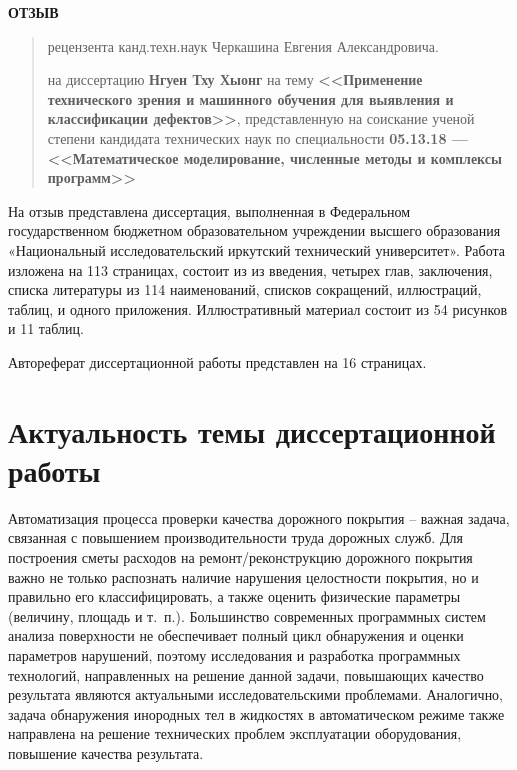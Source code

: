 \documentclass[14pt]{extarticle}
\begin{document}
\thispagestyle{empty}

\vspace{1em}
\begin{center}
  \large\textbf{ОТЗЫВ}
\end{center}
\begin{quote}
  \noindent рецензента канд.техн.наук Черкашина Евгения Александровича.

  \noindent на диссертацию \textbf{Нгуен Тху Хыонг} на тему \textbf{<<Применение технического зрения и машинного обучения для выявления и классификации дефектов>>}, представленную на соискание ученой степени кандидата технических наук по специальности \textbf{05.13.18 — <<Математическое моделирование, численные методы и комплексы программ>>}
\end{quote}


На отзыв представлена диссертация, выполненная в Федеральном государственном бюджетном образовательном учреждении высшего образования «Национальный исследовательский иркутский технический университет».  Работа изложена на 113 страницах, состоит из из введения, четырех глав, заключения, списка литературы из 114 наименований, списков сокращений, иллюстраций, таблиц, и одного приложения.  Иллюстративный материал состоит из 54 рисунков и 11 таблиц.

Автореферат диссертационной работы представлен на 16 страницах.

\section{Актуальность темы диссертационной работы}

Автоматизация процесса проверки качества дорожного покрытия -- важная задача, связанная с повышением производительности труда дорожных служб.  Для построения сметы расходов на ремонт/реконструкцию дорожного покрытия важно не только распознать наличие нарушения целостности покрытия, но и правильно его классифицировать, а также оценить физические параметры (величину, площадь и т.~п.).  Большинство современных программных систем анализа поверхности не обеспечивает полный цикл обнаружения и оценки параметров нарушений, поэтому исследования и разработка программных технологий, направленных на решение данной задачи, повышающих качество результата являются актуальными исследовательскими проблемами.  Аналогично, задача обнаружения инородных тел в жидкостях в автоматическом режиме также направлена на решение технических проблем эксплуатации оборудования, повышение качества результата.
\end{document}
